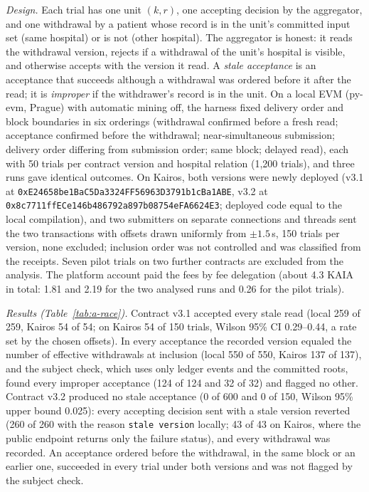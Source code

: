 \emph{Design.} Each trial has one unit $(k,r)$, one accepting decision by the aggregator, and one withdrawal by a patient whose record is in the unit's committed input set (same hospital) or is not (other hospital). The aggregator is honest: it reads the withdrawal version, rejects if a withdrawal of the unit's hospital is visible, and otherwise accepts with the version it read. A \emph{stale acceptance} is an acceptance that succeeds although a withdrawal was ordered before it after the read; it is \emph{improper} if the withdrawer's record is in the unit. On a local EVM (py-evm, Prague) with automatic mining off, the harness fixed delivery order and block boundaries in six orderings (withdrawal confirmed before a fresh read; acceptance confirmed before the withdrawal; near-simultaneous submission; delivery order differing from submission order; same block; delayed read), each with 50 trials per contract version and hospital relation (1,200 trials), and three runs gave identical outcomes. On Kairos, both versions were newly deployed (v3.1 at \texttt{0xE24658\allowbreak be1BaC\allowbreak 5Da332\allowbreak 4FF569\allowbreak 63D379\allowbreak 1b1cBa\allowbreak 1ABE}, v3.2 at \texttt{0x8c7711\allowbreak ffECe1\allowbreak 46b486\allowbreak 792a89\allowbreak 7b0875\allowbreak 4eFA66\allowbreak 24E3}; deployed code equal to the local compilation), and two submitters on separate connections and threads sent the two transactions with offsets drawn uniformly from $\pm1.5$\,s, 150 trials per version, none excluded; inclusion order was not controlled and was classified from the receipts. Seven pilot trials on two further contracts are excluded from the analysis. The platform account paid the fees by fee delegation (about 4.3 KAIA in total: 1.81 and 2.19 for the two analysed runs and 0.26 for the pilot trials).

\emph{Results (Table~\ref{tab:a-race}).} Contract v3.1 accepted every stale read (local 259 of 259, Kairos 54 of 54; on Kairos 54 of 150 trials, Wilson 95\% CI 0.29--0.44, a rate set by the chosen offsets). In every acceptance the recorded version equaled the number of effective withdrawals at inclusion (local 550 of 550, Kairos 137 of 137), and the subject check, which uses only ledger events and the committed roots, found every improper acceptance (124 of 124 and 32 of 32) and flagged no other. Contract v3.2 produced no stale acceptance (0 of 600 and 0 of 150, Wilson 95\% upper bound 0.025): every accepting decision sent with a stale version reverted (260 of 260 with the reason \texttt{stale version} locally; 43 of 43 on Kairos, where the public endpoint returns only the failure status), and every withdrawal was recorded. An acceptance ordered before the withdrawal, in the same block or an earlier one, succeeded in every trial under both versions and was not flagged by the subject check.

